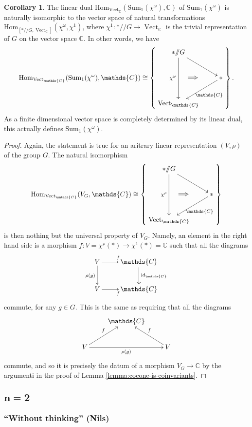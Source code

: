 \documentclass[12pt]{scrartcl}
\newcommand{\C}{\mathds{C}}
\newcommand{\Vect}{\operatorname{Vect}}
\theoremstyle{definition}
\newtheorem{corollary}[definition]{Corollary}
\numberwithin{equation}{section}
\numberwithin{definition}{section}
\numberwithin{figure}{section}
\begin{document}
\begin{corollary}
The linear dual $\mathrm{Hom}_{\Vect_\C}(\text{Sum}_1(\chi^\omega),\C)$ of $\text{Sum}_1(\chi^\omega)$ is naturally isomorphic to the vector space of natural transformations $\mathrm{Hom}_{[*/\!\!/ G,\Vect_\C]}(\chi^\omega,\chi^1)$, where $\chi^1\colon  */\!\!/ G \to \Vect_\C$ is the trivial representation of $G$ on the vector space $\C$. In other words, we have
\[
\mathrm{Hom}_{\Vect_\C}(\text{Sum}_1(\chi^\omega),\C)\cong \left\{
\raisebox{40pt}{\xymatrix{
{*}/\!\!/ G\ar[dd]_{\chi^\omega}\ar[dr]\\
&{*}\ar[dl]^{\C}\\
\Vect_\C
\ar@{=>}(5,-13);(10,-13)
}}
\right\}.
\]
As a finite dimensional vector space is completely determined by its linear dual, this actually defines $\text{Sum}_1(\chi^\omega)$.
\end{corollary}
\begin{proof}
Again, the statement is true for an aritrary linear representation $(V,\rho)$ of the group $G$. The natural isomorphism
\[
\mathrm{Hom}_{\Vect_\C}(V_G,\C)\cong \left\{
\raisebox{40pt}{\xymatrix{
{*}/\!\!/ G\ar[dd]_{\chi^\rho}\ar[dr]\\
&{*}\ar[dl]^{\C}\\
\Vect_\C
\ar@{=>}(5,-13);(10,-13)
}}
\right\}
\]
is then nothing but the universal property of $V_G$. Namely, an element in the right hand side is a morphism $f\colon V=\chi^\rho(*)\to \chi^1(*)=\C$ such that all the diagrams
\[
\xymatrix{
V\ar[d]_{\rho(g)}\ar[r]^f & \C\ar[d]^{\mathrm{id}_\C}\\
V\ar[r]_f &\C
}
\]
commute, for any $g\in G$. This is the same as requiring that all the diagrams
\[
\xymatrix{
&\C\\
V\ar[rr]_{\rho(g)}\ar[ru]^{f} &&V\ar[lu]_{f}
}
\]
commute, and so it is precisely the datum of a morphism $V_G\to \C$ by the argumenti in the proof of Lemma \ref{lemma:cocone-is-coinvariants}.
\end{proof}


\subsection[$n=2$]{$\boldsymbol{n=2}$}

\subsubsection{``Without thinking'' (Nils)}
\end{document}
